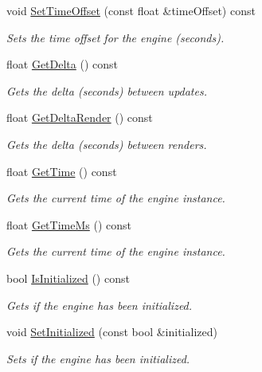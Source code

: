\begin{DoxyCompactItemize}
void \hyperlink{class_flounder_1_1_engine_a96c8cd565b22fb64be503e13a0b12ad8}{Set\+Time\+Offset} (const float \&time\+Offset) const
\begin{DoxyCompactList}\small\item\em Sets the time offset for the engine (seconds). \end{DoxyCompactList}\item 
float \hyperlink{class_flounder_1_1_engine_ac5876a0b6a65eb8fed37c9d04f4573d2}{Get\+Delta} () const
\begin{DoxyCompactList}\small\item\em Gets the delta (seconds) between updates. \end{DoxyCompactList}\item 
float \hyperlink{class_flounder_1_1_engine_a15e8c8c2a39b23c1e9e83f6915784f31}{Get\+Delta\+Render} () const
\begin{DoxyCompactList}\small\item\em Gets the delta (seconds) between renders. \end{DoxyCompactList}\item 
float \hyperlink{class_flounder_1_1_engine_a86c953aca3f5b7ec61f124e4f4a29489}{Get\+Time} () const
\begin{DoxyCompactList}\small\item\em Gets the current time of the engine instance. \end{DoxyCompactList}\item 
float \hyperlink{class_flounder_1_1_engine_a9a356f09dea9c9ae0fbd2e512c9517f8}{Get\+Time\+Ms} () const
\begin{DoxyCompactList}\small\item\em Gets the current time of the engine instance. \end{DoxyCompactList}\item 
bool \hyperlink{class_flounder_1_1_engine_a34ce5b2fc002f2da635e4c01f4da6311}{Is\+Initialized} () const
\begin{DoxyCompactList}\small\item\em Gets if the engine has been initialized. \end{DoxyCompactList}\item 
void \hyperlink{class_flounder_1_1_engine_a4449438de1f74ae3ae0e9cad88abbc1f}{Set\+Initialized} (const bool \&initialized)
\begin{DoxyCompactList}\small\item\em Sets if the engine has been initialized. \end{DoxyCompactList}\item 

\end{DoxyCompactItemize}

